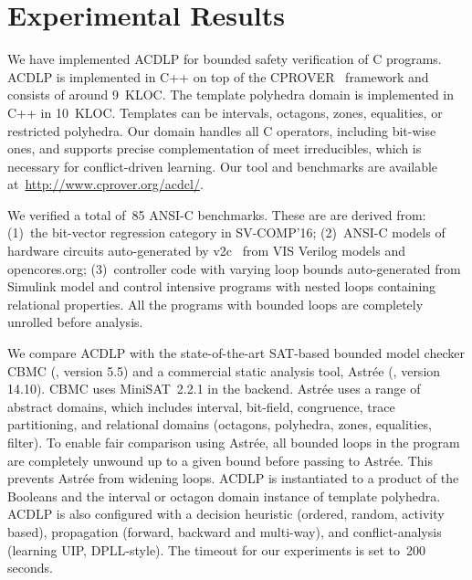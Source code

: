 \section{Experimental Results}
%
We have implemented ACDLP for bounded safety verification of C programs.  
ACDLP is implemented in C++ on top of the
\textsc{CPROVER}~\cite{cprover} framework and consists of around 9~KLOC. 
The template polyhedra domain is implemented in C++ in 10~KLOC.  Templates
can be intervals, octagons, zones, equalities, or restricted polyhedra.  Our
domain handles all C operators, including bit-wise ones, and supports
precise complementation of meet irreducibles, which is necessary for
conflict-driven learning.  Our tool and benchmarks are available 
at~\url{http://www.cprover.org/acdcl/}.
%


We verified a total of~85 ANSI-C benchmarks.  These are are derived from:
(1)~the bit-vector regression category in SV-COMP'16; (2)~ANSI-C models of
hardware circuits auto-generated by v2c~\cite{mtk2016} from VIS Verilog
models and opencores.org; (3)~controller code with varying loop bounds 
auto-generated from Simulink model and control 
intensive programs with nested loops containing relational properties. 
All the programs with bounded loops are completely unrolled before
analysis.

We compare ACDLP with the state-of-the-art SAT-based bounded model checker
CBMC (\cite{cbmc}, version 5.5) and a commercial static analysis tool,
Astr{\'e}e (\cite{astree}, version 14.10).  CBMC uses MiniSAT~2.2.1 in the
backend.  Astr{\'e}e uses a range of abstract domains, which includes
interval, bit-field, congruence, trace partitioning, and relational domains
(octagons, polyhedra, zones, equalities, filter).  To enable fair comparison
using Astr{\'e}e, all bounded loops in the program are completely unwound up
to a given bound before passing to Astr{\'e}e.  This prevents Astr{\'e}e
from widening loops.
%
ACDLP is instantiated to a product of the Booleans
and the interval or octagon domain instance of template polyhedra.  ACDLP is
also configured with a decision heuristic (ordered, random, activity
based), propagation (forward, backward and multi-way), and conflict-analysis
(learning UIP, DPLL-style).  The timeout for our experiments is set to~200
seconds.  
%

